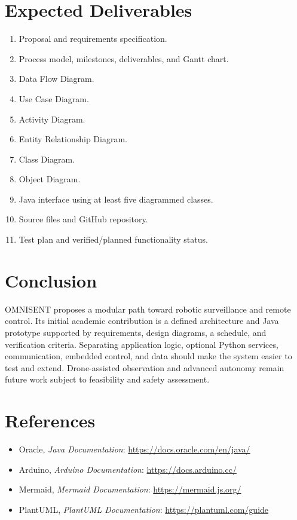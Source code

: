 \documentclass[12pt,a4paper]{article}
\begin{document}
\section{Expected Deliverables}
\begin{enumerate}
\item Proposal and requirements specification.
\item Process model, milestones, deliverables, and Gantt chart.
\item Data Flow Diagram.
\item Use Case Diagram.
\item Activity Diagram.
\item Entity Relationship Diagram.
\item Class Diagram.
\item Object Diagram.
\item Java interface using at least five diagrammed classes.
\item Source files and GitHub repository.
\item Test plan and verified/planned functionality status.
\end{enumerate}

\section{Conclusion}
OMNISENT proposes a modular path toward robotic surveillance and remote control. Its initial academic contribution is a defined architecture and Java prototype supported by requirements, design diagrams, a schedule, and verification criteria. Separating application logic, optional Python services, communication, embedded control, and data should make the system easier to test and extend. Drone-assisted observation and advanced autonomy remain future work subject to feasibility and safety assessment.

\section{References}
\begin{itemize}
\item Oracle, \emph{Java Documentation}: \url{https://docs.oracle.com/en/java/}
\item Arduino, \emph{Arduino Documentation}: \url{https://docs.arduino.cc/}
\item Mermaid, \emph{Mermaid Documentation}: \url{https://mermaid.js.org/}
\item PlantUML, \emph{PlantUML Documentation}: \url{https://plantuml.com/guide}
\end{itemize}
\end{document}
